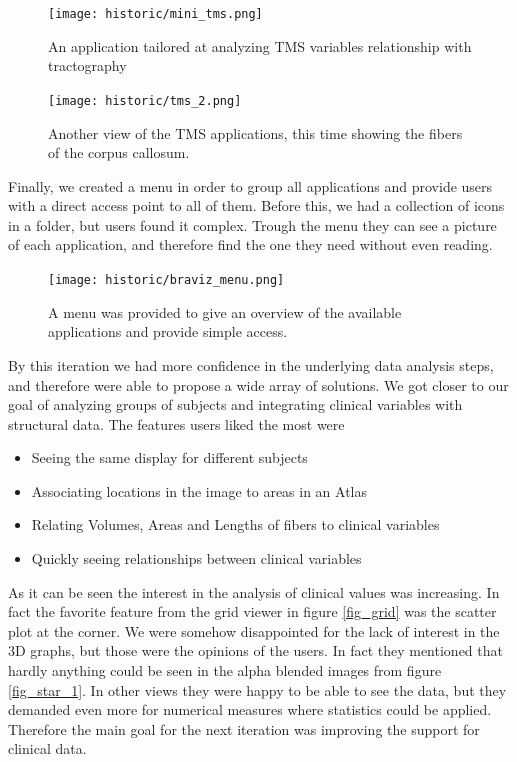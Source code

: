 \begin{figure}
\centering
\texttt{[image: historic/mini\_tms.png]} 
\caption{\label{fig_tms_1}An application tailored at analyzing TMS variables relationship with tractography}
\end{figure}

\begin{figure}
\centering
\texttt{[image: historic/tms\_2.png]} 
\caption{\label{fig_tms_2}Another view of the TMS applications, this time showing the fibers of the corpus callosum.}
\end{figure}

Finally, we created a menu in order to group all applications and provide users with a direct access point to all of them. Before this, we had a collection of icons in a folder, but users found it complex. Trough the menu they can see a picture of each application, and therefore find the one they need without even reading.

\begin{figure}
\centering
\texttt{[image: historic/braviz\_menu.png]} 
\caption{\label{fig_menu_1}A menu was provided to give an overview of the available applications and provide simple access.}
\end{figure}

By this iteration we had more confidence in the underlying data analysis steps, and therefore were able to propose a wide array of solutions. We got closer to our goal of analyzing groups of subjects and integrating clinical variables with structural data. The features users liked the most were

\begin{itemize}
\item Seeing the same display for different subjects
\item Associating locations in the image to areas in an Atlas
\item Relating Volumes, Areas and Lengths of fibers to clinical variables
\item Quickly seeing relationships between clinical variables
\end{itemize}

As it can be seen the interest in the analysis of clinical values was increasing. In fact the favorite feature from the grid viewer in figure \ref{fig_grid} was the scatter plot at the corner. We were somehow disappointed for the lack of interest in the 3D graphs, but those were the opinions of the users. In fact they mentioned that hardly anything could be seen in the alpha blended images from figure \ref{fig_star_1}. In other views they were happy to be able to see the data, but they demanded even more for numerical measures where statistics could be applied. Therefore the main goal for the next iteration was improving the support for clinical data.

